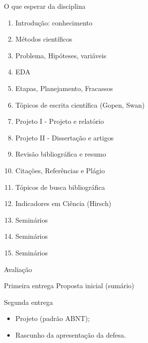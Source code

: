 \documentclass{beamer}
\begin{document}
\begin{frame}{O que esperar da disciplina}
  \begin{enumerate}
  \item<2,7> {Introdução: conhecimento}
  \item<2,7> {Métodos científicos}
  \item<3,7> {Problema, Hipóteses, variáveis}
  \item<3,7> {EDA}
  \item<3,7> {Etapas, Planejamento, Fracassos}
  \item<4,7> \alert<7>{Tópicos de escrita científica} (Gopen, Swan)
  \item<5,7> {Projeto I - Projeto e relatório}
  \item<5,7> {Projeto II - Dissertação e artigos}
  \item<5,7> {Revisão bibliográfica e resumo}
  \item<5,7> {Citações, Referências e Plágio}
  \item<6,7> {Tópicos de busca bibliográfica}
  \item<6,7> \alert<7>{Indicadores em Ciência} (Hirsch)
  \item<1-> Seminários
  \item<1-> Seminários
  \item<1-> Seminários
  \end{enumerate}
\end{frame}

\begin{frame}{Avaliação}
  \begin{block}{Primeira entrega}
    Proposta inicial (sumário)
  \end{block}

  \pause

  \begin{block}{Segunda entrega}
    \begin{itemize}
    \item Projeto (padrão ABNT);
    \item Rascunho da apresentação da defesa.
    \end{itemize}
  \end{block}

\end{frame}
\end{document}
